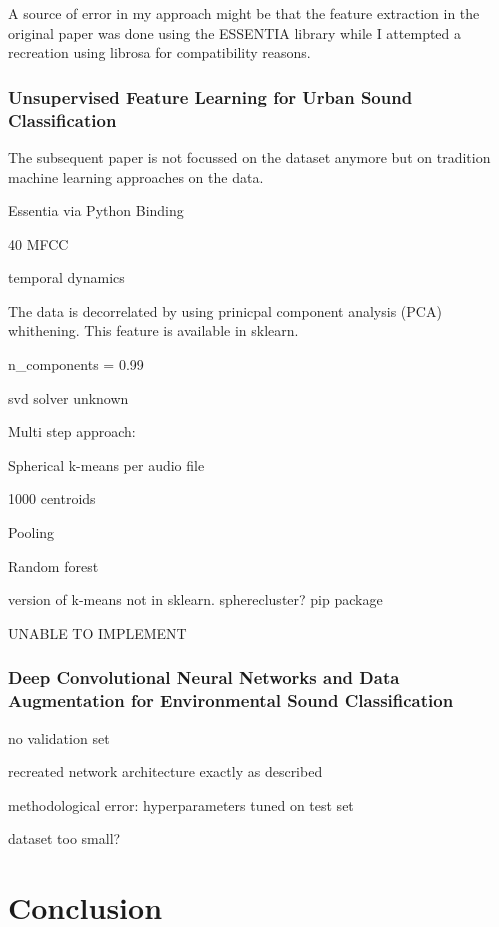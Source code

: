 A source of error in my approach might be that the feature extraction in the original paper was done using the ESSENTIA library \cite{bogdanov:Essentia:ACMMULTIMEDIA13} while I attempted a recreation using librosa for compatibility reasons. 

\subsection{Unsupervised Feature Learning for Urban Sound Classification}

The subsequent paper \cite{7177954} is not focussed on the dataset anymore but on tradition machine learning approaches on the data. 

Essentia via Python Binding

40 MFCC

temporal dynamics

The data is decorrelated by using prinicpal component analysis (PCA) whithening. This feature is available in sklearn.

n_components = 0.99

svd solver unknown



Multi step approach:

Spherical k-means per audio file

1000 centroids

Pooling

Random forest



version of k-means not in sklearn. spherecluster? pip package

UNABLE TO IMPLEMENT


\newpage


\subsection{Deep Convolutional Neural Networks and Data
Augmentation for Environmental Sound
Classification}

no validation set


recreated network architecture exactly as described


methodological error: hyperparameters tuned on test set

dataset too small?





\chapter{Conclusion}

